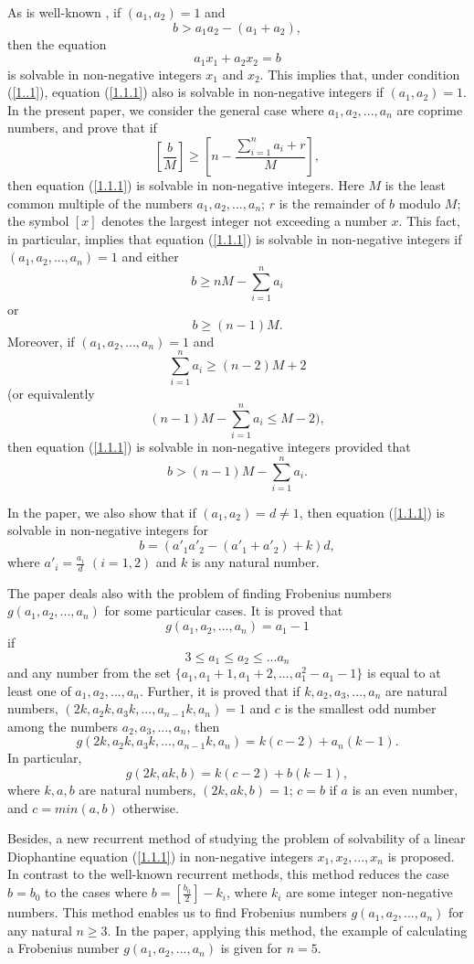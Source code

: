 \documentclass[12pt,reqno,intlim]{amsart}
\numberwithin{equation}{section}
\theoremstyle{definition}
\theoremstyle{remark}
\begin{document}
As is well-known \cite{B},  if  $(a_1,a_2)=1$ and 
\begin{equation}
b>a_1a_2-(a_1+a_2), \label{1..1}
\end{equation}
 then the equation
$$a_1x_1+a_2x_2=b$$
\noindent is solvable in non-negative integers $x_1$ and $x_2$. This implies that, under condition (\ref{1..1}),  equation (\ref{1.1.1}) also is solvable in non-negative integers if $(a_1,a_2)=1$. In the present paper, we consider the general case where $a_1, a_2,...,a_n$ are coprime numbers, and prove that if 
$$\left[\frac{b}{M}\right]\geq \left[n-\frac{\sum_{i=1}^{n}a_i+r}{M}\right],$$ then equation (\ref{1.1.1}) is solvable in non-negative integers. Here $M$ is the least common multiple of the numbers $a_1,a_2,...,a_n$; $r$ is the remainder of $b$ modulo $M$; the symbol $\left[ x \right]$ denotes the largest integer not exceeding a number $x$. This fact, in particular,  implies that equation (\ref{1.1.1}) is solvable in non-negative integers if  $(a_1,a_2,...,a_n)=1$ and either 
$$b\geq nM-\sum_{i=1}^{n}a_i$$
or 
$$b\geq (n-1)M.$$ Moreover, if $(a_1,a_2,...,a_n)=1$ and
$$\sum_{i=1}^na_i\geq (n-2)M+2$$
 (or equivalently $$(n-1)M-\sum_{i=1}^{n}a_i\leq M-2),$$
 then equation (\ref{1.1.1}) is solvable in non-negative integers provided that
 $$b>(n-1)M-\sum_{i=1}^{n}a_i.$$  

In the paper, we also show that if $(a_1,a_2)=d \neq 1$, then equation (\ref{1.1.1}) is solvable in non-negative integers for $$b=(a'_1a'_2-(a'_1+a'_2)+k)d,$$ where $a'_i=\frac{a_i}{d}$ $(i=1,2)$ and $k$ is any natural number. 

The paper deals also with the problem of finding Frobenius numbers $g(a_1,a_2,...,a_n)$ for some particular cases. It is proved that $$g(a_1,a_2,...,a_n)=a_1-1$$ if $$3\leq a_1\leq a_2\leq ...a_n$$ and any number from the set $\lbrace a_1,a_1+1,a_1+2,...,a_1^2-a_1-1\rbrace$ is equal to at least one of $a_1,a_2,...,a_n$. Further, it is proved that if $k,a_2,a_3,...,a_n$ are natural numbers,  $(2k,a_2k,a_3k,...,a_{n-1}k,a_n)=1$ and $c$ is the smallest odd number among the numbers $a_2,a_3,...,a_n$, then $$g(2k,a_2k,a_3k,...,a_{n-1}k,a_n)=k(c-2)+a_n(k-1).$$ In particular, 
$$g(2k,ak,b)=k(c-2)+b(k-1),$$
where $k,a,b$ are natural numbers, $(2k,ak,b)=1$; $c=b$ if $a$ is an even number, and $c=min(a,b)$ otherwise.

Besides, a new recurrent method of studying the problem of solvability of a linear Diophantine equation (\ref{1.1.1}) in non-negative integers $x_1, x_2,..., x_n$ is proposed. In contrast to the well-known recurrent methods, this method reduces the case $b=b_0$ to the cases where $b= \left[\frac{b_0}{2}\right]-k_i$, where $k_i$ are some integer non-negative numbers. This method enables us to find Frobenius numbers $g(a_1,a_2,...,a_n)$ for any natural $n\geq 3$. In the paper, applying this method, the example of calculating a Frobenius number $g(a_1,a_2,...,a_n)$ is given for $n=5$.
\end{document}
